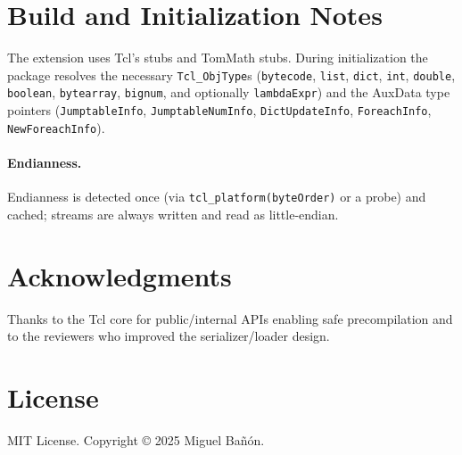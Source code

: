 \documentclass[11pt,a4paper]{article}
\begin{document}
\section{Build and Initialization Notes}
The extension uses Tcl's stubs and TomMath stubs. During initialization the package resolves
the necessary \texttt{Tcl\_ObjType}s (\texttt{bytecode}, \texttt{list}, \texttt{dict}, \texttt{int},
\texttt{double}, \texttt{boolean}, \texttt{bytearray}, \texttt{bignum}, and optionally
\texttt{lambdaExpr}) and the AuxData type pointers (\texttt{JumptableInfo}, \texttt{JumptableNumInfo},
\texttt{DictUpdateInfo}, \texttt{ForeachInfo}, \texttt{NewForeachInfo}).

\paragraph{Endianness.} Endianness is detected once (via \texttt{tcl\_platform(byteOrder)} or a probe) and
cached; streams are always written and read as little-endian.

\section*{Acknowledgments}

Thanks to the Tcl core for public/internal APIs enabling safe precompilation and to the reviewers who improved the serializer/loader design.

\section{License}
MIT License. Copyright \copyright{} 2025 Miguel Bañón.
\end{document}

